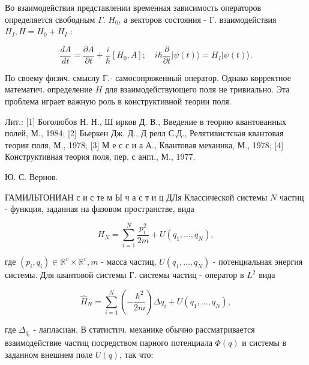 \documentclass[10pt]{article}
\begin{document}
Во взаимодействия представлении временная зависимость операторов определяется свободным $\Gamma$. $H_{0}$, а векторов состояния - Г. взаимодействия $H_{I}, H=H_{0}+H_{I}$ :



\[

\frac{d A}{d t}=\frac{\partial A}{\partial t}+\frac{i}{\hbar}\left[H_{0}, A\right] ; \quad i \hbar \frac{\partial}{\partial t}|\psi(t)\rangle=H_{I}|\psi(t)\rangle .

\]



По своему физич. смыслу Г.- самосопряженный оператор. Однако корректное математич. определение $H$ для взаимодействующего поля не тривиально. Эта проблема играет важную роль в конструктивной теории поля.



Лит.: [1] Боголюбов Н. Н., Ш ирков Д. В., Введение в теорию квантованных полей, М., 1984; [2] Бьеркен Дж. Д., Д релл С.Д., Релятивистская квантовая теория поля, М., 1978; [3] М е с с и а А., Квантовая механика, М., 1978; [4] Конструктивная теория поля, пер. с англ., М., 1977.



Ю. С. Вернов.



ГАМИЛЬТОНИАН с и с те м Ы ч а с т и ц ДЛя Классической системы $N$ частиц - функция, заданная на фазовом пространстве, вида



\[

H_{N}=\sum_{i=1}^{N} \frac{p_{i}^{2}}{2 m}+U\left(q_{1}, \ldots, q_{N}\right),

\]



где $\left(p_{i}, q_{i}\right) \in \mathbb{R}^{v} \times \mathbb{R}^{v}, m$ - масса частиц, $U\left(q_{1}, \ldots, q_{N}\right)$ - потенциальная энергия системы. Для квантовой системы Г. системы частиц - оператор в $L^{2}$ вида



\[

\hat{H}_{N}=\sum_{i=1}^{N}\left(-\frac{\hbar^{2}}{2 m}\right) \Delta q_{i}+U\left(q_{1}, \ldots, q_{N}\right),

\]



где $\Delta_{q_{i}}$ - лапласиан. В статистич. механике обычно рассматривается взаимодействие частиц посредством парного потенциала $\Phi(q)$ и системы в заданном внешнем поле $U(q)$, так что:
\end{document}
